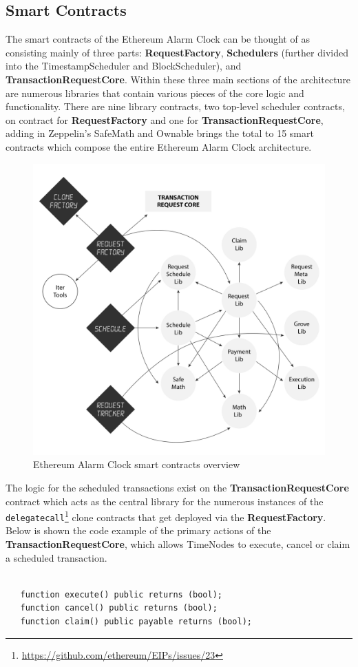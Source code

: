 \documentclass{report}
\begin{document}
  \subsection{Smart Contracts}
  The smart contracts of the Ethereum Alarm Clock can be thought of as consisting mainly of three parts: \textbf{RequestFactory}, \textbf{Schedulers} (further divided into the TimestampScheduler and BlockScheduler), and \textbf{TransactionRequestCore}. Within these three main sections of the architecture are numerous libraries that contain various pieces of the core logic and functionality. There are nine library contracts, two top-level scheduler contracts, on contract for \textbf{RequestFactory} and one for \textbf{TransactionRequestCore}, adding in Zeppelin’s SafeMath and Ownable brings the total to 15 smart contracts which compose the entire Ethereum Alarm Clock architecture.

  \begin{figure}[h]
    \includegraphics[width=\textwidth]{contracts}
    \caption{Ethereum Alarm Clock smart contracts overview}
  \end{figure}

  The logic for the scheduled transactions exist on the \textbf{TransactionRequestCore} contract which acts as the central library for the numerous instances of the \texttt{delegatecall}\footnote{\url{https://github.com/ethereum/EIPs/issues/23}} clone contracts that get deployed via the \textbf{RequestFactory}. Below is shown the code example of the primary actions of the \textbf{TransactionRequestCore}, which allows TimeNodes to execute, cancel or claim a scheduled transaction.
  \begin{verbatim}
     
   function execute() public returns (bool);
   function cancel() public returns (bool);
   function claim() public payable returns (bool);

  \end{verbatim}
\end{document}

